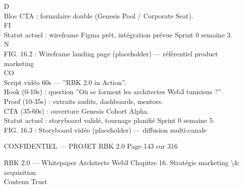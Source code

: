 \vspace{0.5em}
\vspace{0.5em}
\vspace{0.5em}
\vspace{0.5em}
D\\
Bloc CTA : formulaire double (Genesis Pool / Corporate Seat).\\
\vspace{0.5em}
\vspace{0.5em}
\vspace{0.5em}
\vspace{0.5em}
FI\\
Statut actuel : wireframe Figma prêt, intégration prévue Sprint 0 semaine 3.\\
\vspace{0.5em}
\vspace{0.5em}
N\\
FIG. 16.2 : Wireframe landing page (placeholder) — référentiel product marketing\\
CO\\
Script vidéo 60s — ”RBK 2.0 in Action”.\\
Hook (0-10s) : question ”Où se forment les architectes Web3 tunisiens ?”\\
Proof (10-35s) : extraits audits, dashboards, mentors.\\
CTA (35-60s) : ouverture Genesis Cohort Alpha.\\
Statut actuel : storyboard validé, tournage planifié Sprint 0 semaine 5.\\
\vspace{0.5em}
FIG. 16.3 : Storyboard vidéo (placeholder) — diffusion multi-canale\\
\vspace{0.5em}
\vspace{0.5em}
\vspace{0.5em}
\vspace{0.5em}
\begin{confidential}CONFIDENTIEL — PROJET RBK 2.0                                         Page 143 sur 316\end{confidential}
RBK 2.0 — Whitepaper Architecte Web3                                                        Chapitre 16. Stratégie marketing \textbackslash{}& acquisition\\
\vspace{0.5em}
\vspace{0.5em}
\vspace{0.5em}
\vspace{0.5em}
Contenu           Trust\\
